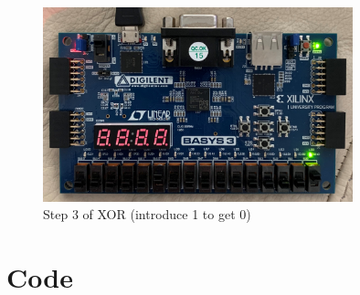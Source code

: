 \documentclass[11pt]{article}
\newcommand{\Verilog}[2][]{%
	
}
\begin{document}
\begin{figure}[ht]\centering
	\includegraphics[width=0.8\textwidth,trim=0cm 0cm 0cm 0cm,clip]{xor_step_3}
	\caption{Step 3 of XOR (introduce 1 to get 0)}
	\label{fig:xor_step_3}			
\end{figure}
\clearpage
			
\section*{Code}

\Verilog[caption=Register Module,label=code:register]{register.sv}

\Verilog[caption=Register Test Bench,label=code:register_test]{register_test.sv}

\Verilog[caption=ALU Module,label=code:alu]{alu.sv}

\Verilog[caption=ALU Test Bench,label=code:alu_test]{alu_test.sv}

\Verilog[caption=Top Module,label=code:top_module]{top_lab9.sv}
\end{document}
